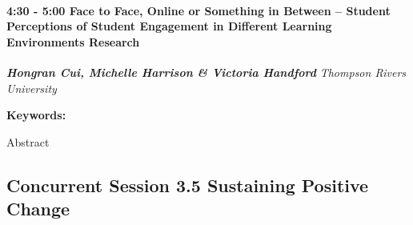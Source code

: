 \documentclass[
]{book}
\begin{document}
\begin{session}
\hypertarget{face-to-face-online-or-something-in-between-student-perceptions-of-student-engagement-in-different-learning-environments-research}{%
\paragraph*{\texorpdfstring{4:30 - 5:00 \textbar{} \textbf{Face to Face,
Online or Something in Between -- Student Perceptions of Student
Engagement in Different Learning Environments} \textbar{}
Research}{4:30 - 5:00 \textbar{} Face to Face, Online or Something in Between -- Student Perceptions of Student Engagement in Different Learning Environments \textbar{} Research}}\label{face-to-face-online-or-something-in-between-student-perceptions-of-student-engagement-in-different-learning-environments-research}}

\textbf{\emph{Hongran Cui, Michelle Harrison \& Victoria Handford}}
\textbar{} \emph{Thompson Rivers University}

\textbf{Keywords:}

Abstract
\end{session}

\hypertarget{concurrent-session-3.5-sustaining-positive-change}{%
\subsection*{Concurrent Session 3.5 \textbar{} Sustaining Positive Change}\label{concurrent-session-3.5-sustaining-positive-change}}
\end{document}
